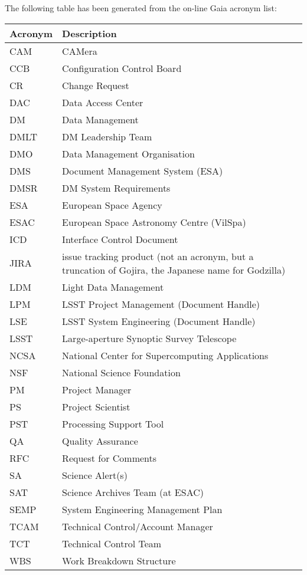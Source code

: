 The following table has been generated from the on-line Gaia acronym list:
\newline\newline%
\addtocounter{table}{-1}
\begin{longtable}{|l|p{}|}\hline 
\textbf{Acronym} & \textbf{Description}  \\\hline
CAM&CAMera \\\hline
CCB&Configuration Control Board \\\hline
CR&Change Request \\\hline
DAC&Data Access Center \\\hline
DM&Data Management \\\hline
DMLT&DM Leadership Team \\\hline
DMO&Data Management Organisation \\\hline
DMS&Document Management System (ESA) \\\hline
DMSR&DM System Requirements \\\hline
ESA&European Space Agency \\\hline
ESAC&European Space Astronomy Centre (VilSpa) \\\hline
ICD&Interface Control Document \\\hline
JIRA&issue tracking product (not an acronym, but a truncation of Gojira, the Japanese name for Godzilla) \\\hline
LDM&Light Data Management \\\hline
LPM&LSST Project Management (Document Handle) \\\hline
LSE&LSST System Engineering (Document Handle) \\\hline
LSST&Large-aperture Synoptic Survey Telescope \\\hline
NCSA&National Center for Supercomputing Applications \\\hline
NSF&National Science Foundation \\\hline
PM&Project Manager \\\hline
PS&Project Scientist \\\hline
PST&Processing Support Tool \\\hline
QA&Quality Assurance \\\hline
RFC&Request for Comments \\\hline
SA&Science Alert(s) \\\hline
SAT&Science Archives Team (at ESAC) \\\hline
SEMP&System Engineering Management Plan \\\hline
TCAM&Technical Control/Account Manager \\\hline
TCT&Technical Control Team \\\hline
WBS&Work Breakdown Structure \\\hline
\end{longtable} 

